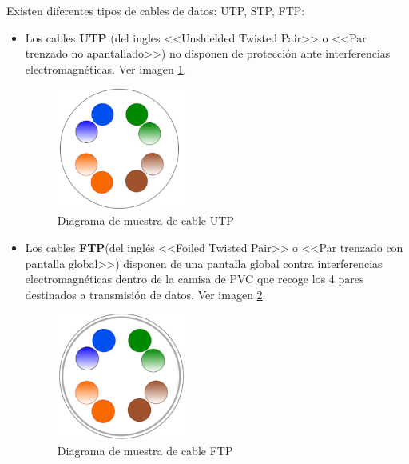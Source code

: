 Existen diferentes tipos de cables de datos: UTP, STP, FTP:
\begin{itemize}
\item Los cables \textbf{UTP} (del ingles <<Unshielded Twisted Pair>> o <<Par trenzado no apantallado>>) no disponen de protección ante interferencias electromagnéticas. Ver imagen \ref{Img:Muestra UTP}.

\begin{figure}
    \centering
    \includegraphics[width=0.4\textwidth]{img/UTP.pdf}
    \caption{Diagrama de muestra de cable UTP} \label{Img:Muestra UTP}
\end{figure}

\item Los cables \textbf{FTP}(del inglés <<Foiled Twisted Pair>> o <<Par trenzado con pantalla global>>) disponen de una pantalla global contra interferencias electromagnéticas dentro de la camisa de PVC que recoge los 4 pares destinados a transmisión de datos. Ver imagen \ref{Img:Muestra FTP}.

\begin{figure}
    \centering
    \includegraphics[width=0.4\textwidth]{img/FTP.pdf}
    \caption{Diagrama de muestra de cable FTP} \label{Img:Muestra FTP}
\end{figure}


\end{itemize}
